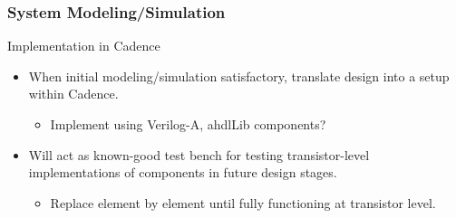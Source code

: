 \documentclass[t, screen, aspectratio=43]{beamer}
\begin{document}
\begin{frame}
	\frametitle{System Modeling/Simulation}
	\begin{block}{Implementation in Cadence}
		\vspace{-.2em}
		\begin{itemize}
			\footnotesize
			\item When initial modeling/simulation satisfactory, translate design into a setup within Cadence.
			\begin{itemize}
				\footnotesize
				\item Implement using Verilog-A, ahdlLib components?
			\end{itemize}
			\footnotesize
			\item Will act as known-good test bench for testing transistor-level implementations of components in future design stages.
			\begin{itemize}
				\footnotesize
				\item Replace element by element until fully functioning at transistor level.
			\end{itemize}
		\end{itemize}    
	\end{block}
\end{frame}

\end{document}
